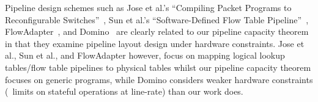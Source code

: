 
 Pipeline design schemes such as Jose et al.'s ``Compiling Packet Programs to Reconfigurable Switches''~\cite{Jose-et-al}, Sun et al.'s ``Software-Defined Flow Table Pipeline''~\cite{Sun-et-al}, FlowAdapter~\cite{FlowAdapter}, and Domino~\cite{Domino} are clearly related to our pipeline capacity theorem in that they examine pipeline layout design under hardware constraints. Jose et al., Sun et al., and FlowAdapter  however, focus on mapping logical lookup tables/flow table pipelines to physical tables whilst our pipeline capacity theorem focuses on generic programs, while Domino considers weaker hardware constraints (\eg\ limits on stateful operations at line-rate) than our work does.
